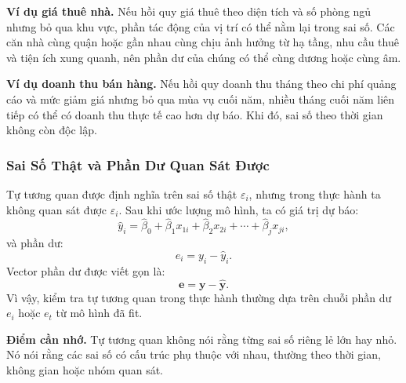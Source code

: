 \textbf{Ví dụ giá thuê nhà.} Nếu hồi quy giá thuê theo diện tích và số phòng ngủ nhưng bỏ qua khu vực, phần tác động của vị trí có thể nằm lại trong sai số. Các căn nhà cùng quận hoặc gần nhau cùng chịu ảnh hưởng từ hạ tầng, nhu cầu thuê và tiện ích xung quanh, nên phần dư của chúng có thể cùng dương hoặc cùng âm.

\textbf{Ví dụ doanh thu bán hàng.} Nếu hồi quy doanh thu tháng theo chi phí quảng cáo và mức giảm giá nhưng bỏ qua mùa vụ cuối năm, nhiều tháng cuối năm liên tiếp có thể có doanh thu thực tế cao hơn dự báo. Khi đó, sai số theo thời gian không còn độc lập.

\subsubsection{Sai Số Thật và Phần Dư Quan Sát Được}

Tự tương quan được định nghĩa trên sai số thật $\varepsilon_i$, nhưng trong thực hành ta không quan sát được $\varepsilon_i$. Sau khi ước lượng mô hình, ta có giá trị dự báo:
\[
  \hat{y}_i
  =
  \hat{\beta}_0
  + \hat{\beta}_1x_{1i}
  + \hat{\beta}_2x_{2i}
  + \cdots
  + \hat{\beta}_jx_{ji},
\]
và phần dư:
\[
  e_i = y_i - \hat{y}_i.
\]
Vector phần dư được viết gọn là:
\[
  \mathbf{e}=\mathbf{y}-\hat{\mathbf{y}}.
\]
Vì vậy, kiểm tra tự tương quan trong thực hành thường dựa trên chuỗi phần dư $e_i$ hoặc $e_t$ từ mô hình đã fit.

\begin{notebox}
\textbf{Điểm cần nhớ.} Tự tương quan không nói rằng từng sai số riêng lẻ lớn hay nhỏ. Nó nói rằng các sai số có cấu trúc phụ thuộc với nhau, thường theo thời gian, không gian hoặc nhóm quan sát.
\end{notebox}

